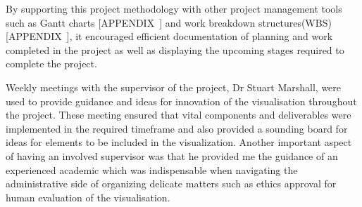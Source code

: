 By supporting this project methodology with other project management tools such
as Gantt charts [APPENDIX~] and work breakdown structures(WBS) [APPENDIX~], it
encouraged efficient documentation of planning and work completed in the project
as well as displaying the upcoming stages required to complete the project.

Weekly meetings with the supervisor of the project, Dr Stuart Marshall, were
used to provide guidance and ideas for innovation of the visualisation
throughout the project. These meeting ensured that vital components and
deliverables were implemented in the required timeframe and also provided a
sounding board for ideas for elements to be included in the visualization.
Another important aspect of having an involved supervisor was that he provided
me the guidance of an experienced academic which was indispensable when
navigating the administrative side of organizing delicate matters such as ethics
approval for human evaluation of the visualisation.
